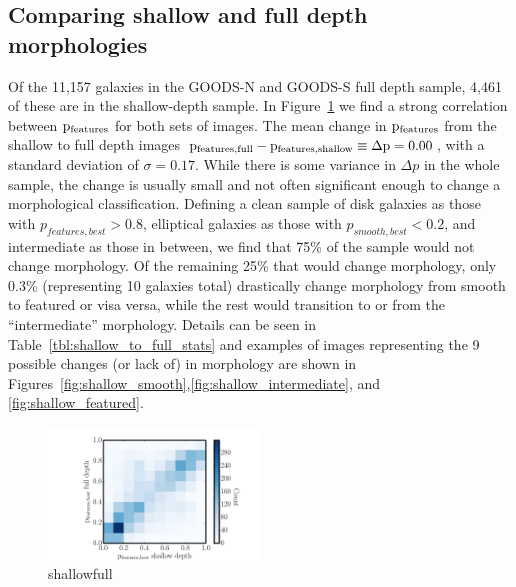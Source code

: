 \documentclass[twocolumn]{aastex6}
\begin{document}
\subsection{Comparing shallow and full depth morphologies}

Of the 11,157 galaxies in the GOODS-N and GOODS-S full depth sample, 4,461 of these are in the shallow-depth sample. In Figure~\ref{fig:shallow_vs_full} we find a strong correlation between $\rm p_{features}$ for both sets of images. The mean change in $\rm p_{features}$ from the shallow to full depth images  $\rm p_{features,full} - p_{features,shallow} \equiv \Delta p = 0.00$, with a standard deviation of $\sigma = 0.17$. While there is some variance in $\Delta p$ in the whole sample, the change is usually small and not often significant enough to change a morphological classification. Defining a clean sample of disk galaxies as those with $p_{features,best}>0.8$, elliptical galaxies as those with  $p_{smooth,best}<0.2$, and intermediate as those in between, we find that 75\% of the sample would not change morphology. Of the remaining 25\% that would change morphology, only 0.3\% (representing 10 galaxies total) drastically change morphology from smooth to featured or visa versa, while the rest would transition to or from the ``intermediate'' morphology. Details can be seen in Table~\ref{tbl:shallow_to_full_stats} and examples of images representing the 9 possible changes (or lack of) in morphology are shown in Figures~\ref{fig:shallow_smooth},\ref{fig:shallow_intermediate}, and \ref{fig:shallow_featured}.

\begin{figure}
\begin{center}
\includegraphics[width=0.50\textwidth]{figures/full_shallow_p_plot.pdf}
\caption{shallowfull}
\label{fig:shallow_vs_full}
\end{center}
\end{figure}
\end{document}
